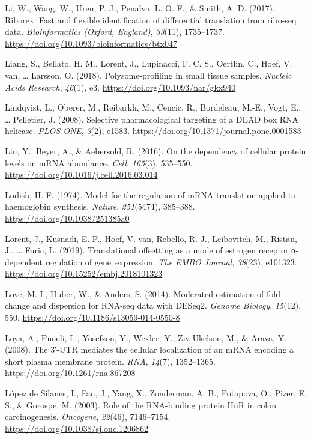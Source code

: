 \documentclass[12pt,openany]{book}
\begin{document}
\hypertarget{ref-Li2017}{}
Li, W., Wang, W., Uren, P. J., Penalva, L. O. F., \& Smith, A. D.
(2017). Riborex: Fast and flexible identification of differential
translation from ribo-seq data. \emph{Bioinformatics (Oxford, England)},
\emph{33}(11), 1735--1737.
\url{https://doi.org/10.1093/bioinformatics/btx047}

\hypertarget{ref-Liang2018}{}
Liang, S., Bellato, H. M., Lorent, J., Lupinacci, F. C. S., Oertlin, C.,
Hoef, V. van, \ldots{} Larsson, O. (2018). Polysome-profiling in small
tissue samples. \emph{Nucleic Acids Research}, \emph{46}(1), e3.
\url{https://doi.org/10.1093/nar/gkx940}

\hypertarget{ref-Lindqvist2008}{}
Lindqvist, L., Oberer, M., Reibarkh, M., Cencic, R., Bordeleau, M.-E.,
Vogt, E., \ldots{} Pelletier, J. (2008). Selective pharmacological
targeting of a DEAD box RNA helicase. \emph{PLOS ONE}, \emph{3}(2),
e1583. \url{https://doi.org/10.1371/journal.pone.0001583}

\hypertarget{ref-Liu2016}{}
Liu, Y., Beyer, A., \& Aebersold, R. (2016). On the dependency of
cellular protein levels on mRNA abundance. \emph{Cell}, \emph{165}(3),
535--550. \url{https://doi.org/10.1016/j.cell.2016.03.014}

\hypertarget{ref-Lodish1974}{}
Lodish, H. F. (1974). Model for the regulation of mRNA translation
applied to haemoglobin synthesis. \emph{Nature}, \emph{251}(5474),
385--388. \url{https://doi.org/10.1038/251385a0}

\hypertarget{ref-Lorent2019}{}
Lorent, J., Kusnadi, E. P., Hoef, V. van, Rebello, R. J., Leibovitch,
M., Ristau, J., \ldots{} Furic, L. (2019). Translational offsetting as a
mode of estrogen receptor α-dependent regulation of gene~expression.
\emph{The EMBO Journal}, \emph{38}(23), e101323.
\url{https://doi.org/10.15252/embj.2018101323}

\hypertarget{ref-Love2014}{}
Love, M. I., Huber, W., \& Anders, S. (2014). Moderated estimation of
fold change and dispersion for RNA-seq data with DESeq2. \emph{Genome
Biology}, \emph{15}(12), 550.
\url{https://doi.org/10.1186/s13059-014-0550-8}

\hypertarget{ref-Loya2008}{}
Loya, A., Pnueli, L., Yosefzon, Y., Wexler, Y., Ziv-Ukelson, M., \&
Arava, Y. (2008). The 3′-UTR mediates the cellular localization of an
mRNA encoding a short plasma membrane protein. \emph{RNA}, \emph{14}(7),
1352--1365. \url{https://doi.org/10.1261/rna.867208}

\hypertarget{ref-LopezdeSilanes2003}{}
López de Silanes, I., Fan, J., Yang, X., Zonderman, A. B., Potapova, O.,
Pizer, E. S., \& Gorospe, M. (2003). Role of the RNA-binding protein HuR
in colon carcinogenesis. \emph{Oncogene}, \emph{22}(46), 7146--7154.
\url{https://doi.org/10.1038/sj.onc.1206862}
\end{document}
